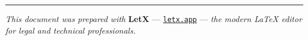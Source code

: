 \vspace{16pt}
\color{rulecolor}\rule{\linewidth}{0.6pt}

\begin{center}
  {\footnotesize\color{midgray}
  \textit{This document was prepared with} \textbf{LetX} ---
  \href{https://letx.app}{\texttt{letx.app}} ---
  \textit{the modern LaTeX editor for legal and technical professionals.}
  }
\end{center}
